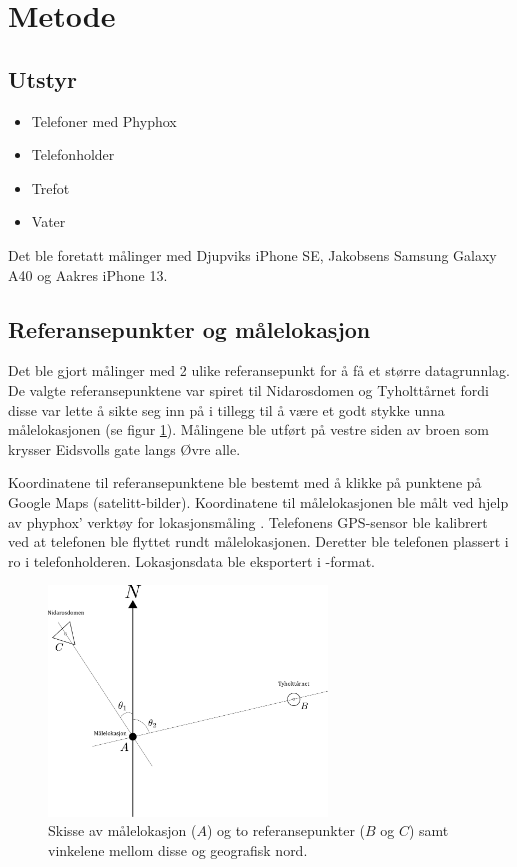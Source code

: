 \section{Metode}
\subsection*{Utstyr}
\begin{itemize}
    \item Telefoner med Phyphox
    \item Telefonholder
    \item Trefot
    \item Vater
\end{itemize}
Det ble foretatt målinger med Djupviks iPhone SE, Jakobsens Samsung Galaxy A40 og Aakres iPhone 13. 

\subsection{Referansepunkter og målelokasjon}
Det ble gjort målinger med 2 ulike referansepunkt for å få et større datagrunnlag. De valgte referansepunktene var spiret til Nidarosdomen og Tyholttårnet fordi disse var lette å sikte seg inn på i tillegg til å være et godt stykke unna målelokasjonen (se figur \ref{fig:angle_north}). 
Målingene ble utført på vestre siden av broen som krysser Eidsvolls gate langs Øvre alle. 

Koordinatene til referansepunktene ble bestemt med å klikke på punktene på Google Maps (satelitt-bilder). 
Koordinatene til målelokasjonen ble målt ved hjelp av phyphox' verktøy for lokasjonsmåling \cite{phyphox}. Telefonens GPS-sensor ble kalibrert ved at telefonen ble flyttet rundt målelokasjonen. 
Deretter ble telefonen plassert i ro i telefonholderen. 
Lokasjonsdata ble eksportert i -format.

\begin{figure}[h!]
    \centering
    \includegraphics[width=0.66\textwidth, trim={0 100 0 0}, clip]{img/angle_north.pdf}
    \caption{
    Skisse av målelokasjon ($A$) og to referansepunkter ($B$ og $C$) samt vinkelene mellom disse og geografisk nord.}
    \label{fig:angle_north}
\end{figure}


